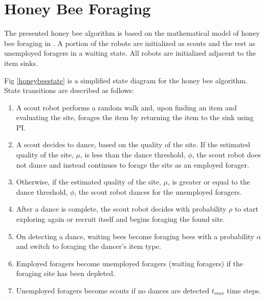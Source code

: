 \section{Honey Bee Foraging}

The presented honey bee algorithm is based on the mathematical model of honey bee foraging in \cite{seeley2009wisdom}. A portion of the robots are initialized as scouts and the rest  as unemployed foragers in a waiting state. All robots are initialized adjacent to the item sinks.

Fig \ref{honeybeestate} is a simplified state diagram for the honey bee algorithm. State transitions are described as follows: 

\begin{enumerate}

\item A scout robot performs a random walk and, upon finding an item and evaluating the site, forages the item by returning the item to the sink using PI. 

\item A scout decides to dance, based on the quality of the site. If the estimated quality of the site, $\mu$, is less than the dance threshold, $\phi$, the scout robot does not dance and instead continues to forage the site as an employed forager.

\item Otherwise, if the estimated quality of the site, $\mu$, is greater or equal to the dance threshold, $\phi$, the scout robot dances for the unemployed foragers.

\item After a dance is complete, the scout robot decides with probability $\rho$ to start exploring again or recruit itself and begins foraging the found site.

\item On detecting a dance, waiting bees become foraging bees with a probability $\alpha$ and switch to foraging the dancer's item type.

\item Employed foragers become unemployed foragers (waiting foragers) if the foraging site has been depleted.

\item Unemployed foragers become scouts if no dances are detected $t_{max}$ time steps.

\end{enumerate}

